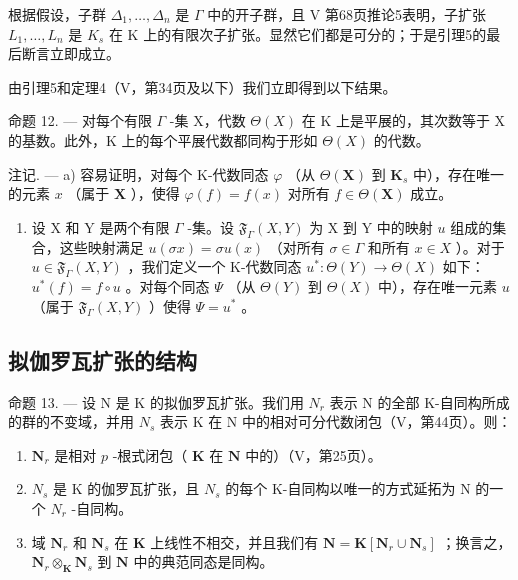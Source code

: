 根据假设，子群 \(\Delta_{1},\ldots,\Delta_{n}\) 是 \(\Gamma\) 中的开子群，且 V 第68页推论5表明，子扩张 \(L_{1},\ldots,L_{n}\) 是 \(K_{s}\) 在 K 上的有限次子扩张。显然它们都是可分的；于是引理5的最后断言立即成立。

由引理5和定理4（V，第34页及以下）我们立即得到以下结果。

命题 12. --- 对每个有限 \(\Gamma\) -集 X，代数 \(\Theta(X)\) 在 K 上是平展的，其次数等于 X 的基数。此外，K 上的每个平展代数都同构于形如 \(\Theta(X)\) 的代数。

注记. --- a) 容易证明，对每个 K-代数同态 \(\varphi\) （从 \(\Theta(\mathbf{X})\) 到 \(\mathbf{K}_s\) 中），存在唯一的元素 \(x\) （属于 \(\mathbf{X}\) ），使得 \(\varphi(f) = f(x)\) 对所有 \(f \in \Theta(\mathbf{X})\) 成立。

\begin{enumerate}
\def\labelenumi{\arabic{enumi})}
\setcounter{enumi}{1}
\tightlist
\item
  设 X 和 Y 是两个有限 \(\Gamma\) -集。设 \(\mathfrak{F}_{\Gamma}(X, Y)\) 为 X 到 Y 中的映射 \(u\) 组成的集合，这些映射满足 \(u(\sigma x) = \sigma u(x)\) （对所有 \(\sigma \in \Gamma\) 和所有 \(x \in X\) ）。对于 \(u \in \mathfrak{F}_{\Gamma}(X, Y)\) ，我们定义一个 K-代数同态 \(u^{*}: \Theta(Y) \to \Theta(X)\) 如下： \(u^{*}(f) = f \circ u\) 。对每个同态 \(\Psi\) （从 \(\Theta(Y)\) 到 \(\Theta(X)\) 中），存在唯一元素 \(u\) （属于 \(\mathfrak{F}_{\Gamma}(X, Y)\) ）使得 \(\Psi = u^{*}\) 。
\end{enumerate}

\subsection{拟伽罗瓦扩张的结构}

命题 13. --- 设 N 是 K 的拟伽罗瓦扩张。我们用 \(N_{r}\) 表示 N 的全部 K-自同构所成的群的不变域，并用 \(N_{s}\) 表示 K 在 N 中的相对可分代数闭包（V，第44页）。则：

\begin{enumerate}
\def\labelenumi{\alph{enumi})}
\item
  \(\mathbf{N}_r\) 是相对 \(p\) -根式闭包（ \(\mathbf{K}\) 在 \(\mathbf{N}\) 中的）（V，第25页）。
\item
  \(N_{s}\) 是 K 的伽罗瓦扩张，且 \(N_{s}\) 的每个 K-自同构以唯一的方式延拓为 N 的一个 \(N_{r}\) -自同构。
\item
  域 \(\mathbf{N}_r\) 和 \(\mathbf{N}_s\) 在 \(\mathbf{K}\) 上线性不相交，并且我们有 \(\mathbf{N} = \mathbf{K}[\mathbf{N}_r \cup \mathbf{N}_s]\) ；换言之， \(\mathbf{N}_r \otimes_{\mathbf{K}} \mathbf{N}_s\) 到 \(\mathbf{N}\) 中的典范同态是同构。
\end{enumerate}

